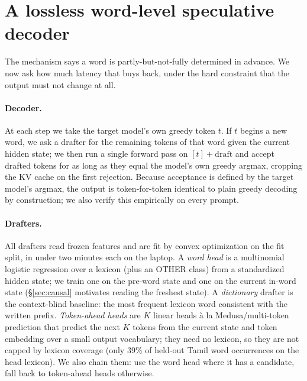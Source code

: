 \documentclass[11pt]{article}
\begin{document}
\section{A lossless word-level speculative decoder}
\label{sec:decoder}

The mechanism says a word is partly-but-not-fully determined in advance. We now
ask how much latency that buys back, under the hard constraint that the output
must not change at all.

\paragraph{Decoder.} At each step we take the target model's own greedy token
$t$. If $t$ begins a new word, we ask a drafter for the remaining tokens of that
word given the current hidden state; we then run a single forward pass on
$[t] + \text{draft}$ and accept drafted tokens for as long as they equal the
model's own greedy argmax, cropping the KV cache on the first rejection. Because
acceptance is defined by the target model's argmax, the output is
token-for-token identical to plain greedy decoding by construction; we also
verify this empirically on every prompt.

\paragraph{Drafters.} All drafters read frozen features and are fit by convex
optimization on the fit split, in under two minutes each on the laptop.
A \emph{word head} is a multinomial logistic regression over a lexicon
(plus an OTHER class) from a standardized hidden state; we train one on the
pre-word state and one on the current in-word state (\S\ref{sec:causal}
motivates reading the freshest state). A \emph{dictionary} drafter is the
context-blind baseline: the most frequent lexicon word consistent with the
written prefix. \emph{Token-ahead heads} are $K$ linear heads
\`a la Medusa/multi-token prediction \citep{cai2024medusa,gloeckle2024multitoken}
that predict the next $K$ tokens from the current state and token embedding over
a small output vocabulary; they need no lexicon, so they are not capped by
lexicon coverage (only $39\%$ of held-out Tamil word occurrences on the head
lexicon). We also chain them: use the word head where it has a candidate, fall
back to token-ahead heads otherwise.
\end{document}
